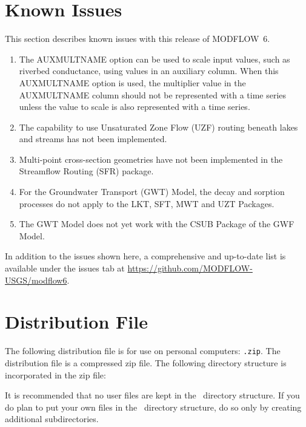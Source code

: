 \documentclass[11pt,twoside,twocolumn]{usgsreport}
\begin{document}
\section{Known Issues}
This section describes known issues with this release of MODFLOW~6.  

\begin{enumerate}

\item
The AUXMULTNAME option can be used to scale input values, such as riverbed conductance, using values in an auxiliary column.  When this AUXMULTNAME option is used, the multiplier value in the AUXMULTNAME column should not be represented with a time series unless the value to scale is also represented with a time series.  

\item
The capability to use Unsaturated Zone Flow (UZF) routing beneath lakes and streams has not been implemented.

\item
Multi-point cross-section geometries have not been implemented in the Streamflow Routing (SFR) package.

\item
For the Groundwater Transport (GWT) Model, the decay and sorption processes do not apply to the LKT, SFT, MWT and UZT Packages.

\item
The GWT Model does not yet work with the CSUB Package of the GWF Model.  

\end{enumerate}

In addition to the issues shown here, a comprehensive and up-to-date list is available under the issues tab at \url{https://github.com/MODFLOW-USGS/modflow6}.


\section{Distribution File}
The following distribution file is for use on personal computers: \texttt{\modflowversion.zip}.  The distribution file is a compressed zip file. The following directory structure is incorporated in the zip file:



It is recommended that no user files are kept in the \modflowversion~directory structure.  If you do plan to put your own files in the \modflowversion~directory structure, do so only by creating additional subdirectories.
\end{document}
